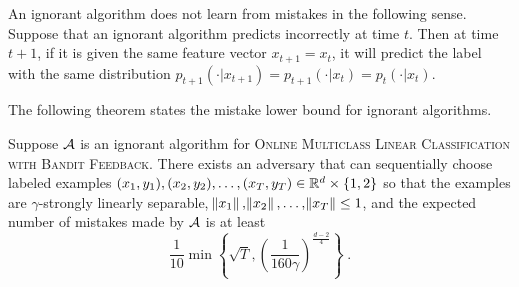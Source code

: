 An ignorant algorithm does not learn from mistakes in the following sense.
Suppose that an ignorant algorithm predicts incorrectly at time $t$. Then at
time $t+1$, if it is given the same feature vector $x_{t+1}=x_t$, it will
predict the label with the same distribution
$p_{t+1}(\cdot|x_{t+1})=p_{t+1}(\cdot|x_t)=p_t(\cdot|x_t)$.


The following theorem states the mistake lower bound for ignorant algorithms.

\begin{theorem}
\label{theorem:ignorant-lower-bound}
Suppose $\mathcal{A}$ is an ignorant algorithm for \textsc{Online Multiclass Linear
Classification with Bandit Feedback}. There exists an adversary that can
sequentially choose labeled examples $(x_1, y_1), (x_2, y_2), \dots, (x_T, y_T)
\in \mathbb{R}^d\times \{1,2\}$ so that the examples are $\gamma$-strongly linearly
separable, $\norm{x_1}, \norm{x_2}, \dots, \norm{x_T} \le 1$, and the expected
number of mistakes made by $\mathcal{A}$ is at least
$$
\frac{1}{10}\min\left\{\sqrt{T}, \left(\frac{1}{160\gamma}\right)^{\frac{d-2}{4}} \right\} \; .
$$
\end{theorem}

